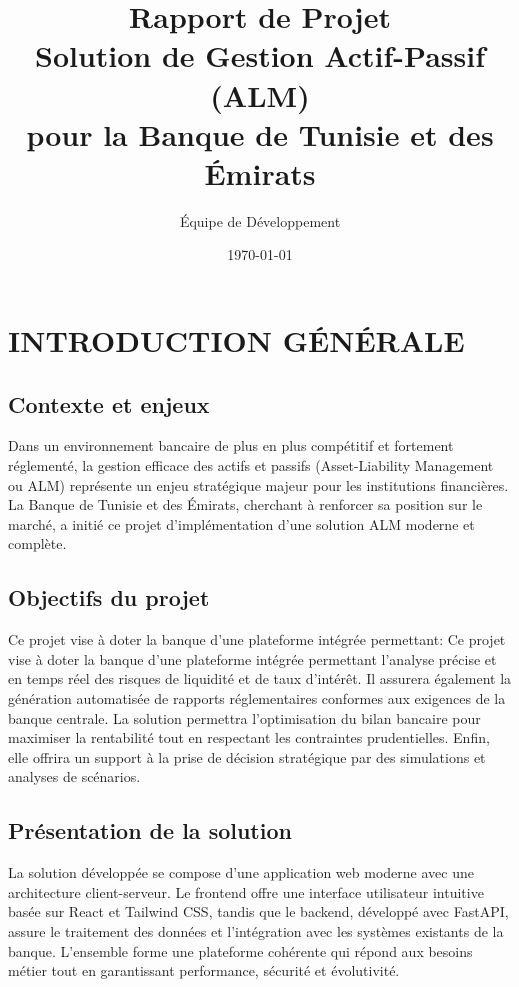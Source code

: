 \documentclass[12pt,a4paper]{report}
\title{\Huge\textbf{Rapport de Projet\\
Solution de Gestion Actif-Passif (ALM)\\
pour la Banque de Tunisie et des Émirats}}
\author{Équipe de Développement}
\date{\today}
\begin{document}
\maketitle
\thispagestyle{empty}

\tableofcontents
\thispagestyle{empty}
\clearpage

\chapter*{INTRODUCTION GÉNÉRALE}

\section*{Contexte et enjeux}
Dans un environnement bancaire de plus en plus compétitif et fortement réglementé, la gestion efficace des actifs et passifs (Asset-Liability Management ou ALM) représente un enjeu stratégique majeur pour les institutions financières. La Banque de Tunisie et des Émirats, cherchant à renforcer sa position sur le marché, a initié ce projet d'implémentation d'une solution ALM moderne et complète.

\section*{Objectifs du projet}
Ce projet vise à doter la banque d'une plateforme intégrée permettant:
Ce projet vise à doter la banque d'une plateforme intégrée permettant l'analyse précise et en temps réel des risques de liquidité et de taux d'intérêt. Il assurera également la génération automatisée de rapports réglementaires conformes aux exigences de la banque centrale. La solution permettra l'optimisation du bilan bancaire pour maximiser la rentabilité tout en respectant les contraintes prudentielles. Enfin, elle offrira un support à la prise de décision stratégique par des simulations et analyses de scénarios.

\section*{Présentation de la solution}
La solution développée se compose d'une application web moderne avec une architecture client-serveur. Le frontend offre une interface utilisateur intuitive basée sur React et Tailwind CSS, tandis que le backend, développé avec FastAPI, assure le traitement des données et l'intégration avec les systèmes existants de la banque. L'ensemble forme une plateforme cohérente qui répond aux besoins métier tout en garantissant performance, sécurité et évolutivité.
\end{document}
